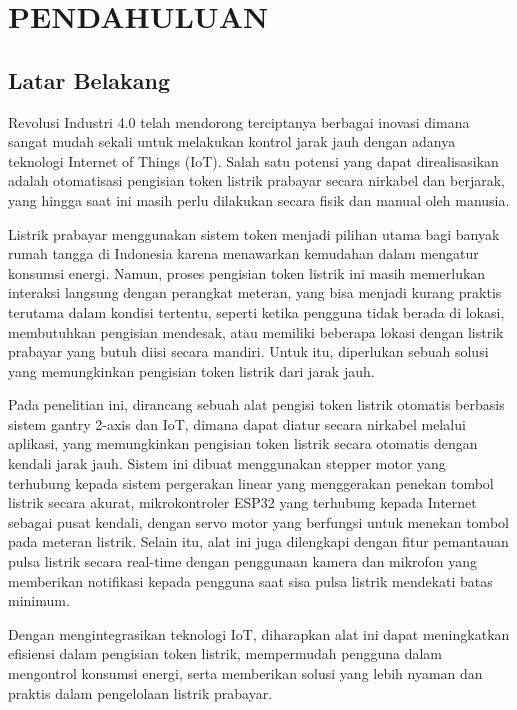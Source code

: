 \chapter{PENDAHULUAN}

\section{Latar Belakang}

Revolusi Industri 4.0 telah mendorong terciptanya berbagai inovasi dimana sangat mudah sekali untuk melakukan kontrol jarak jauh dengan adanya teknologi Internet of Things (IoT). Salah satu potensi yang dapat direalisasikan adalah otomatisasi pengisian token listrik prabayar secara nirkabel dan berjarak, yang hingga saat ini masih perlu dilakukan secara fisik dan manual oleh manusia.

Listrik prabayar menggunakan sistem token menjadi pilihan utama bagi banyak rumah tangga di Indonesia karena menawarkan kemudahan dalam mengatur konsumsi energi. Namun, proses pengisian token listrik ini masih memerlukan interaksi langsung dengan perangkat meteran, yang bisa menjadi kurang praktis terutama dalam kondisi tertentu, seperti ketika pengguna tidak berada di lokasi, membutuhkan pengisian mendesak, atau memiliki beberapa lokasi dengan listrik prabayar yang butuh diisi secara mandiri. Untuk itu, diperlukan sebuah solusi yang memungkinkan pengisian token listrik dari jarak jauh.

Pada penelitian ini, dirancang sebuah alat pengisi token listrik otomatis berbasis sistem gantry 2-axis dan IoT, dimana dapat diatur secara nirkabel melalui aplikasi, yang memungkinkan pengisian token listrik secara otomatis dengan kendali jarak jauh. Sistem ini dibuat menggunakan stepper motor yang terhubung kepada sistem pergerakan linear yang menggerakan penekan tombol listrik secara akurat, mikrokontroler ESP32 yang terhubung kepada Internet sebagai pusat kendali, dengan servo motor yang berfungsi untuk menekan tombol pada meteran listrik. Selain itu, alat ini juga dilengkapi dengan fitur pemantauan pulsa listrik secara real-time dengan penggunaan kamera dan mikrofon yang memberikan notifikasi kepada pengguna saat sisa pulsa listrik mendekati batas minimum.

Dengan mengintegrasikan teknologi IoT, diharapkan alat ini dapat meningkatkan efisiensi dalam pengisian token listrik, mempermudah pengguna dalam mengontrol konsumsi energi, serta memberikan solusi yang lebih nyaman dan praktis dalam pengelolaan listrik prabayar.

